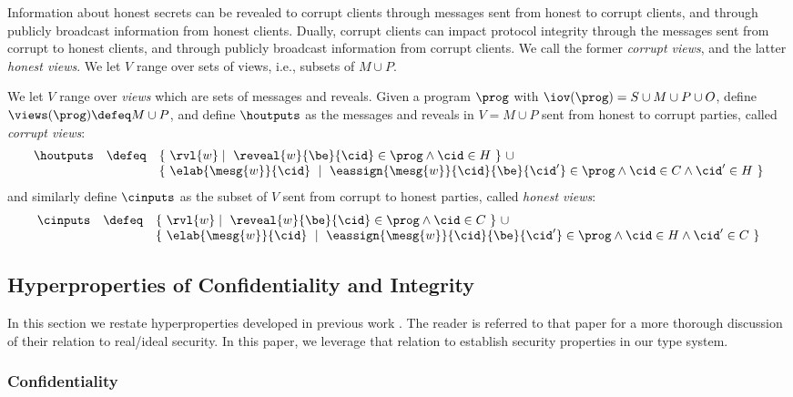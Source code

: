 Information about honest secrets can be revealed to corrupt clients
through messages sent from honest to corrupt clients, and through
publicly broadcast information from honest clients. Dually,
corrupt clients can impact protocol integrity through the messages
sent from corrupt to honest clients, and through publicly broadcast information
from corrupt clients. We call the former \emph{corrupt views}, and
the latter \emph{honest views}. We let $V$ range over sets
of views, i.e., subsets of $M \cup P$.
\begin{definition}
  We let $V$ range over \emph{views} which are sets of messages
  and reveals. Given a program $\prog$ with $\iov(\prog) = S \cup M \cup P \cup O$,
  define $\views(\prog) \defeq M \cup P$, and define $\houtputs$ as
  the messages and reveals in $V = M \cup P$ sent from honest to corrupt
  parties, called \emph{corrupt views}:
  $$
  \begin{array}{lcl}
    \houtputs & \defeq
        & \{\ \rvl{w} \mid\ \reveal{w}{\be}{\cid} \in \prog \wedge \cid \in H \ \}\ \cup \\
      & & \{\ \elab{\mesg{w}}{\cid}\ \mid\  \eassign{\mesg{w}}{\cid}{\be}{\cid'} \in
           \prog \wedge \cid \in C \wedge \cid' \in H \ \} 
  \end{array}
  $$
  and similarly define $\cinputs$ as the subset of $V$ sent from corrupt to honest
  parties, called \emph{honest views}:
  $$
  \begin{array}{lcl}
    \cinputs &  \defeq
        & \{\ \rvl{w} \mid\ \reveal{w}{\be}{\cid} \in \prog \wedge \cid \in C \ \} \ \cup\\
      & & \{\ \elab{\mesg{w}}{\cid}\ \mid\  \eassign{\mesg{w}}{\cid}{\be}{\cid'} \in
              \prog \wedge \cid \in H \wedge \cid' \in C \ \}
  \end{array}
  $$
\end{definition}

\subsection{Hyperproperties of Confidentiality and Integrity}

In this section we restate hyperproperties developed in previous work
\cite{skalka-near-ppdp24}. The reader is referred to that paper for a more
thorough discussion of their relation to real/ideal security. In this
paper, we leverage that relation to establish security properties in
our type system.

\subsubsection{Confidentiality}

